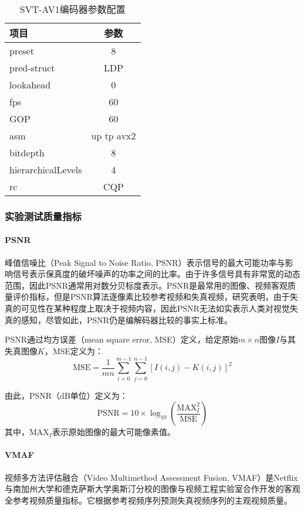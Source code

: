   \begin{table}[!hpt]
    \renewcommand{\arraystretch}{0.9}
    \caption{SVT-AV1编码器参数配置}
    \label{tab:svt}
    \centering
    \begin{tabular}{lc} \toprule
      项目& 参数  \\ \midrule
      preset     &8\\
      pred-struct& LDP\\
      lookahead    &0\\
      fps    &60\\
      GOP    &60\\
      asm    & up tp avx2\\
      bitdepth & 8\\
      hierarchicalLevels  & 4 \\
      rc & CQP\\ \bottomrule
    \end{tabular}
  \end{table}

	\subsubsection{实验测试质量指标}
	
	\paragraph{PSNR}
	峰值信噪比（Peak Signal to Noise Ratio, PSNR）表示信号的最大可能功率与影响信号表示保真度的破坏噪声的功率之间的比率。由于许多信号具有非常宽的动态范围，因此PSNR通常用对数分贝标度表示。PSNR是最常用的图像、视频客观质量评价指标，但是PSNR算法逐像素比较参考视频和失真视频，研究\cite{huynh-thuAccuracyPSNRPredicting2012}表明，由于失真的可见性在某种程度上取决于视频内容，因此PSNR无法如实表示人类对视觉失真的感知，尽管如此，PSNR仍是编解码器比较的事实上标准。
	
	PSNR通过均方误差（mean square error, MSE）定义，给定原始$m\times n$图像$I$与其失真图像$K$，MSE定义为：
	\begin{equation}
		\mathrm{MSE} = \frac{1}{mn} \sum_{i=0}^{m-1} \sum_{j=0}^{n-1}[I(i, j) - K(i, j)]^2
	\end{equation}
	
	由此，PSNR（dB单位）定义为：
	\begin{equation}
	\mathrm{PSNR} = 10 \times \log_10 \left(\frac{\mathrm{MAX}_I^2}{\mathrm{MSE}}\right)
	\end{equation}
	其中，$\mathrm{MAX}_I$表示原始图像的最大可能像素值。
	\paragraph{VMAF}
	视频多方法评估融合（Video Multimethod Assessment Fusion, VMAF\cite{liPracticalPerceptualVideo}）是Netflix与南加州大学和德克萨斯大学奥斯汀分校的图像与视频工程实验室合作开发的客观全参考视频质量指标。它根据参考视频序列预测失真视频序列的主观视频质量。
	
